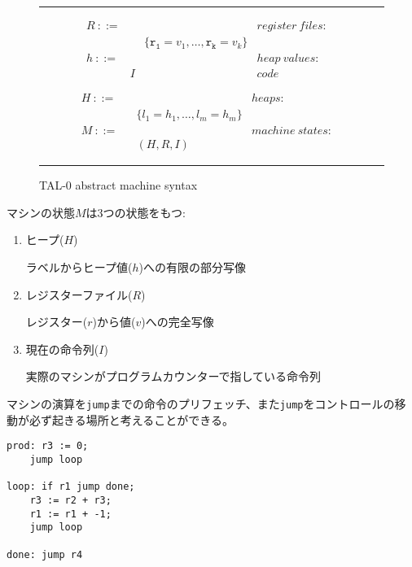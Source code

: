 \documentclass[a4paper,oneside]{ltjsarticle}
\begin{document}
\begin{figure}[ht]
	\label{fig:tal0syntax}
	\noindent\hrule{}

	\begin{minipage}[t]{.5\textwidth}
		\begin{align*}
			&R\ \mathtt{::=}&&&register\ files:&\\
			&&&\{\mathtt{r_1}=v_1,\dots ,\mathtt{r_k}=v_k\}&&&\\
			&h\ \mathtt{::=}&&&heap\ values:&\\
			&&I&&code&
		\end{align*}
	\end{minipage}%
	\vrule{}
	\begin{minipage}[t]{.5\textwidth}
		\hfill\begin{align*}
			&H\ \mathtt{::=}&&&heaps:&\\
			&&&\{l_1=h_1,\dots ,l_m=h_m\}&&&\\
			&M\ \mathtt{::=}&&&machine\ states:&\\
			&&&\left(H,R,I\right)&&&
		\end{align*}
	\end{minipage}

	\noindent\hrule{}
	\caption{TAL-0 abstract machine syntax}
\end{figure}

マシンの状態$M$は3つの状態をもつ:
\begin{enumerate}
	\item ヒープ($H$)

		ラベルからヒープ値($h$)への有限の部分写像
	\item レジスターファイル($R$)

		レジスター($r$)から値($v$)への完全写像
	\item 現在の命令列($I$)

		実際のマシンがプログラムカウンターで指している命令列
\end{enumerate}

マシンの演算を\texttt{jump}までの命令のプリフェッチ、また\texttt{jump}をコントロールの移動が必ず起きる場所と考えることができる。
\begin{lstlisting}[caption=example,label={lst:example}]
prod: r3 := 0;
	jump loop

loop: if r1 jump done;
	r3 := r2 + r3;
	r1 := r1 + -1;
	jump loop

done: jump r4
\end{lstlisting}
\end{document}
